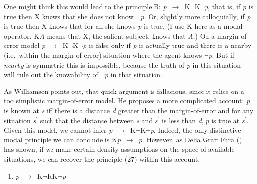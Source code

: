 \documentclass[
  11pt,
  letterpaper,
  DIV=11,
  numbers=noendperiod,
  oneside]{scrartcl}
\providecommand{\tightlist}{%
  \setlength{\itemsep}{0pt}\setlength{\parskip}{0pt}}\usepackage{longtable,booktabs,array}
\begin{document}
One might think this would lead to the principle B:
\emph{p}~\({\rightarrow}\)~K\(\neg\)K\(\neg\)\emph{p}, that is, if
\emph{p} is true then X knows that she does not know \(\neg\)\emph{p}.
Or, slightly more colloquially, if \emph{p} is true then X knows that
for all she knows \emph{p} is true. (I use K here as a modal operator.
K\emph{A} means that X, the salient subject, knows that \emph{A}.) On a
margin-of-error model
\emph{p}~\({\rightarrow}\)~K\(\neg\)K\(\neg\)\emph{p} is false only if
\emph{p} is actually true and there is a nearby (i.e.~within the
margin-of-error) situation where the agent knows \(\neg\)\emph{p}. But
if \emph{nearby} is symmetric this is impossible, because the truth of
\emph{p} in this situation will rule out the knowability of
\(\neg\)\emph{p} in that situation.

As Williamson points out, that quick argument is fallacious, since it
relies on a too simplistic margin-of-error model. He proposes a more
complicated account: \emph{p} is known at \emph{s} iff there is a
distance \emph{d} greater than the margin-of-error and for any situation
\emph{s}\(^\prime\) such that the distance between \emph{s} and
\emph{s}\(^\prime\) is less than \emph{d}, \emph{p} is true at
\emph{s}\(^\prime\). Given this model, we cannot infer
\emph{p}~\({\rightarrow}\)~K\(\neg\)K\(\neg\)\emph{p}. Indeed, the only
distinctive modal principle we can conclude is
K\emph{p}~\({\rightarrow}\)~\emph{p}. However, as Delia Graff Fara
() has shown, if we make certain density
assumptions on the space of available situations, we can recover the
principle (27) within this account.

\begin{enumerate}
\def\labelenumi{\arabic{enumi}.}
\setcounter{enumi}{26}
\tightlist
\item
  \emph{p}~\({\rightarrow}\)~K\(\neg\)KK\(\neg\)\emph{p}
\end{enumerate}
\end{document}
